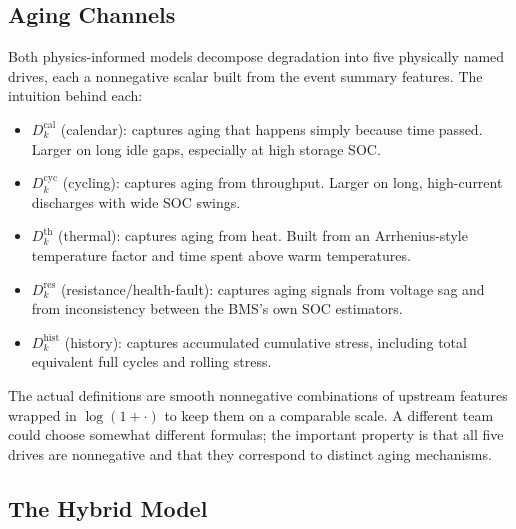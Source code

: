 \documentclass[11pt]{article}
\begin{document}
\subsection{Aging Channels}

Both physics-informed models decompose degradation into five physically
named drives, each a nonnegative scalar built from the event summary
features. The intuition behind each:
\begin{itemize}[leftmargin=*]
    \item \(D^{\mathrm{cal}}_k\) (calendar): captures aging that happens
    simply because time passed. Larger on long idle gaps, especially at
    high storage SOC.
    \item \(D^{\mathrm{cyc}}_k\) (cycling): captures aging from
    throughput. Larger on long, high-current discharges with wide SOC
    swings.
    \item \(D^{\mathrm{th}}_k\) (thermal): captures aging from heat.
    Built from an Arrhenius-style temperature factor and time spent
    above warm temperatures.
    \item \(D^{\mathrm{res}}_k\) (resistance/health-fault): captures
    aging signals from voltage sag and from inconsistency between the
    BMS's own SOC estimators.
    \item \(D^{\mathrm{hist}}_k\) (history): captures accumulated
    cumulative stress, including total equivalent full cycles and
    rolling stress.
\end{itemize}
The actual definitions are smooth nonnegative combinations of upstream
features wrapped in \(\log(1 + \cdot)\) to keep them on a comparable
scale. A different team could choose somewhat different formulas; the
important property is that all five drives are nonnegative and that
they correspond to distinct aging mechanisms.

\subsection{The Hybrid Model}
\end{document}
